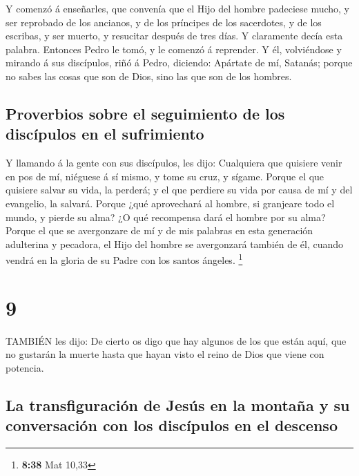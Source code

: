  Y comenzó á enseñarles, que convenía que el Hijo del
hombre padeciese mucho, y ser reprobado de los ancianos, y de los
príncipes de los sacerdotes, y de los escribas, y ser muerto, y
resucitar después de tres días.  Y claramente decía esta
palabra. Entonces Pedro le tomó, y le comenzó á reprender. 
Y él, volviéndose y mirando á sus discípulos, riñó á Pedro, diciendo:
Apártate de mí, Satanás; porque no sabes las cosas que son de Dios, sino
las que son de los hombres.

\hypertarget{proverbios-sobre-el-seguimiento-de-los-discuxedpulos-en-el-sufrimiento}{%
\subsection{Proverbios sobre el seguimiento de los discípulos en el
sufrimiento}\label{proverbios-sobre-el-seguimiento-de-los-discuxedpulos-en-el-sufrimiento}}

 Y llamando á la gente con sus discípulos, les dijo:
Cualquiera que quisiere venir en pos de mí, niéguese á sí mismo, y tome
su cruz, y sígame.  Porque el que quisiere salvar su vida,
la perderá; y el que perdiere su vida por causa de mí y del evangelio,
la salvará.  Porque ¿qué aprovechará al hombre, si
granjeare todo el mundo, y pierde su alma?  ¿O qué
recompensa dará el hombre por su alma?  Porque el que se
avergonzare de mí y de mis palabras en esta generación adulterina y
pecadora, el Hijo del hombre se avergonzará también de él, cuando vendrá
en la gloria de su Padre con los santos ángeles. \footnote{\textbf{8:38}
  Mat 10,33}

\hypertarget{section-8}{%
\section{9}\label{section-8}}

 TAMBIÉN les dijo: De cierto os digo que hay algunos de los
que están aquí, que no gustarán la muerte hasta que hayan visto el reino
de Dios que viene con potencia.

\hypertarget{la-transfiguraciuxf3n-de-jesuxfas-en-la-montauxf1a-y-su-conversaciuxf3n-con-los-discuxedpulos-en-el-descenso}{%
\subsection{La transfiguración de Jesús en la montaña y su conversación
con los discípulos en el
descenso}\label{la-transfiguraciuxf3n-de-jesuxfas-en-la-montauxf1a-y-su-conversaciuxf3n-con-los-discuxedpulos-en-el-descenso}}


